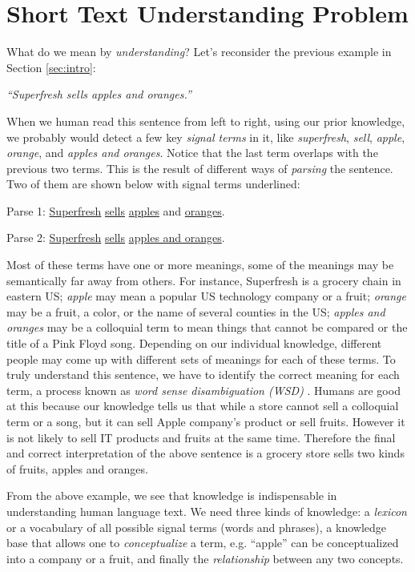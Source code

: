 \section{Short Text Understanding Problem}
\label{sec:problem}
What do we mean by {\em understanding}? Let's reconsider the previous example
in Section \ref{sec:intro}:

{\em ``Superfresh sells apples and oranges.''}

When we human read this sentence from left to right, using our
prior knowledge, we probably would detect
a few key {\em signal terms} in it, like {\em superfresh}, {\em sell}, 
{\em apple}, {\em orange}, and {\em apples and oranges}. Notice that
the last term overlaps with the previous two terms. This is the result of
different ways of {\em parsing} the sentence. Two of them
are shown below with signal terms underlined:

Parse 1: \underline{Superfresh} \underline{sells} 
\underline{apples} and \underline{oranges}.

Parse 2: \underline{Superfresh} \underline{sells} 
\underline{apples and oranges}.

Most of these terms have one or more meanings,
some of the meanings may be semantically far away from others. For instance,
Superfresh is a grocery chain in eastern US;
{\em apple} may mean a popular US technology company or a fruit; 
{\em orange} may be a fruit, a color, or the name of several counties
in the US; {\em apples and oranges} may be a colloquial term to mean
things that cannot be compared or the title of a Pink Floyd song. 
Depending on our individual knowledge, different people may 
come up with different sets of meanings for each of these terms.
To truly understand this sentence, we have to identify the correct meaning
for each term, a process known as {\em word sense disambiguation (WSD)}
\cite{Navigli09:WSD}. 
Humans are good at this because our knowledge tells us that while a store
cannot sell a colloquial term or a song, but it can sell 
Apple company's product or sell fruits. However it
is not likely to sell IT products and fruits at the same time.  
Therefore the final and correct interpretation of the above sentence is
a grocery store sells two kinds of fruits, apples and oranges.

From the above example, we see that knowledge is indispensable in understanding
human language text. We need three kinds of knowledge: a 
{\em lexicon} or a vocabulary of all possible signal terms (words and phrases), 
a knowledge base that allows one to {\em conceptualize} a term, e.g.
``apple'' can be conceptualized into a company or a fruit, and
finally the {\em relationship} between any two concepts.

